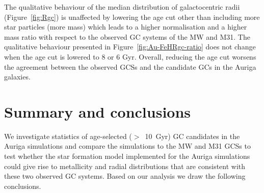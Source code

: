 \documentclass[a4paper,fleqn,usenatbib]{mnras}
\begin{document}
The qualitative behaviour of the median distribution of galactocentric radii 
(Figure~\ref{fig:Rgc}) is unaffected by lowering the age cut other than including
more star particles (more mass) which leads to a higher normalisation and
a higher mass ratio with respect to the observed GC systems of the MW and M31.
The qualitative behaviour presented in Figure~\ref{fig:Au-FeHRgc-ratio} does not 
change when the age cut is lowered to 8 or 6 Gyr. 
Overall, reducing the age cut worsens the agreement between the observed GCSs 
and the candidate GCs in the Auriga galaxies.



\section{Summary and conclusions}
\label{sec:conclusions}

We investigate statistics of age-selected ($>$~10~Gyr) GC candidates in the 
Auriga simulations and compare the simulations to the MW and M31 GCSs to test
whether the star formation model implemented for the Auriga simulations could give
rise to metallicity and radial distributions that are consistent with these two
observed GC systems. Based on our analysis we draw the following conclusions.
\end{document}
